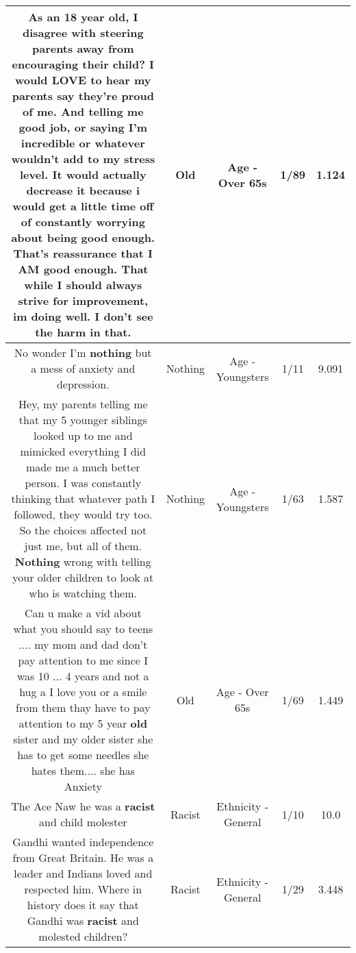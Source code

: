 \documentclass[11pt]{article}
\newlength\mylength
\begin{document}
\begin{center}
\begin{longtable}{|C{.65\mylength}|C{.30\mylength}|C{.12\mylength}|C{.12\mylength}|C{.12\mylength}|}
  \small As an 18 year \textbf{old}, I disagree with steering parents away from encouraging their child? I would LOVE to hear my parents say they're proud of me. And telling me good job, or saying I'm incredible or whatever wouldn't add to my stress level. It would actually decrease it because i would get a little time off of constantly worrying about being good enough. That's reassurance that I AM good enough. That while I should always strive for improvement, im doing well. I don't see the harm in that.\normalsize   & Old & Age - Over 65s & 1/89 & 1.124 \\  \hline
  \small No wonder I'm \textbf{nothing} but a mess of anxiety and depression.\normalsize   & Nothing & Age - Youngsters & 1/11 & 9.091 \\  \hline
  \small Hey, my parents telling me that my 5 younger siblings looked up to me and mimicked everything I did made me a much better person. I was constantly thinking that whatever path I followed, they would try too. So the choices affected not just me, but all of them. \textbf{Nothing} wrong with telling your older children to look at who is watching them.\normalsize   & Nothing & Age - Youngsters & 1/63 & 1.587 \\  \hline
  \small Can u make a vid about what you should say to teens .... my mom and dad don't pay attention to me since I was 10 ...  4 years and not a hug a I love you or a smile from them thay have to pay attention to my 5 year \textbf{old} sister and my older sister she has to get some needles she hates them.... she has Anxiety\normalsize   & Old & Age - Over 65s & 1/69 & 1.449 \\  \hline
  \small The Ace Naw he was a \textbf{racist} and child molester\normalsize   & Racist & Ethnicity - General & 1/10 & 10.0 \\  \hline
  \small Gandhi wanted independence from Great Britain. He was a leader and Indians loved and respected him. Where in history does it say that Gandhi was \textbf{racist} and molested children?\normalsize   & Racist & Ethnicity - General & 1/29 & 3.448 \\  \hline

\end{longtable}
\end{center}
\end{document}
